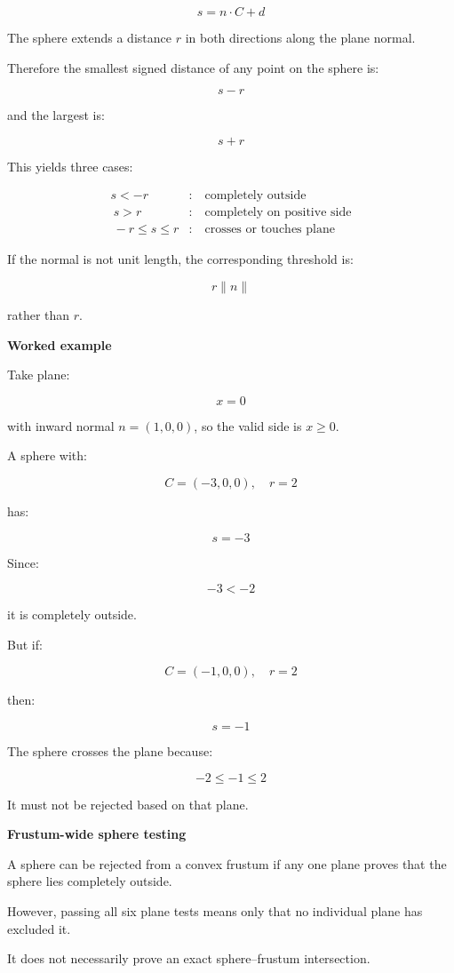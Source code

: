 \[
s=n\cdot C+d
\]

The sphere extends a distance \(r\) in both directions along the plane normal.

Therefore the smallest signed distance of any point on the sphere is:

\[
s-r
\]

and the largest is:

\[
s+r
\]

This yields three cases:

\[
\boxed{ \begin{aligned} s<-r&:\quad\text{completely outside}\\\ s>r&:\quad\text{completely on positive side}\\\ -r\le s\le r&:\quad\text{crosses or touches plane} \end{aligned} }
\]

If the normal is not unit length, the corresponding threshold is:

\[
r\|n\|
\]

rather than \(r\).

\textbf{Worked example}

Take plane:

\[
x=0
\]

with inward normal \(n=(1,0,0)\), so the valid side is \(x\ge0\).

A sphere with:

\[
C=(-3,0,0),\quad r=2
\]

has:

\[
s=-3
\]

Since:

\[
-3<-2
\]

it is completely outside.

But if:

\[
C=(-1,0,0),\quad r=2
\]

then:

\[
s=-1
\]

The sphere crosses the plane because:

\[
-2\le-1\le2
\]

It must not be rejected based on that plane.

\textbf{Frustum-wide sphere testing}

A sphere can be rejected from a convex frustum if any one plane proves that the sphere lies completely outside.

However, passing all six plane tests means only that no individual plane has excluded it.

It does not necessarily prove an exact sphere--frustum intersection.

